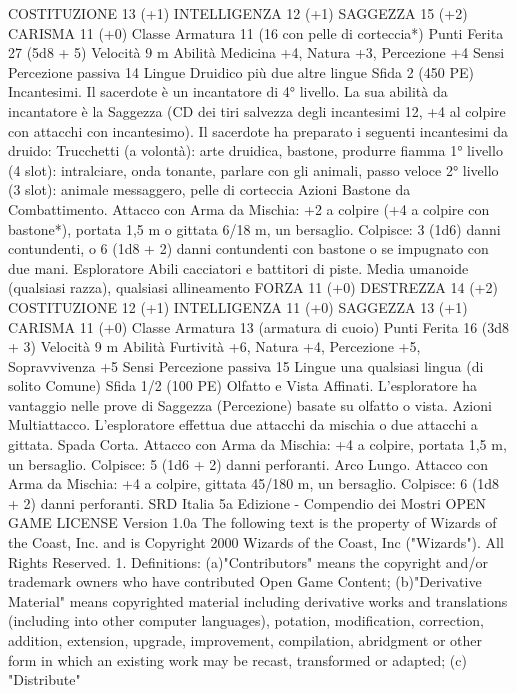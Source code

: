 \begin{multicols}{2}
COSTITUZIONE 13 (+1)
INTELLIGENZA 12 (+1)
SAGGEZZA 15 (+2)
CARISMA 11 (+0)
Classe Armatura 11 (16 con pelle di corteccia*)
Punti Ferita 27 (5d8 + 5)
Velocità 9 m
Abilità Medicina +4, Natura +3, Percezione +4
Sensi Percezione passiva 14
Lingue Druidico più due altre lingue
Sfida 2 (450 PE)
Incantesimi. Il sacerdote è un incantatore di 4° livello. La sua
abilità da incantatore è la Saggezza (CD dei tiri salvezza degli
incantesimi 12, +4 al colpire con attacchi con incantesimo). Il
sacerdote ha preparato i seguenti incantesimi da druido:
Trucchetti (a volontà): arte druidica, bastone, produrre fiamma
1° livello (4 slot): intralciare, onda tonante, parlare con gli
animali, passo veloce
2° livello (3 slot): animale messaggero, pelle di corteccia
Azioni
Bastone da Combattimento. Attacco con Arma da Mischia: +2 a
colpire (+4 a colpire con bastone*), portata 1,5 m o gittata 6/18
m, un bersaglio.
Colpisce: 3 (1d6) danni contundenti, o 6 (1d8 + 2) danni
contundenti con bastone o se impugnato con due mani.
Esploratore
Abili cacciatori e battitori di piste.
Media umanoide (qualsiasi razza), qualsiasi allineamento
FORZA 11 (+0)
DESTREZZA 14 (+2)
COSTITUZIONE 12 (+1)
INTELLIGENZA 11 (+0)
SAGGEZZA 13 (+1)
CARISMA 11 (+0)
Classe Armatura 13 (armatura di cuoio)
Punti Ferita 16 (3d8 + 3)
Velocità 9 m
Abilità Furtività +6, Natura +4, Percezione +5, Sopravvivenza
+5
Sensi Percezione passiva 15
Lingue una qualsiasi lingua (di solito Comune)
Sfida 1/2 (100 PE)
Olfatto e Vista Affinati. L’esploratore ha vantaggio nelle prove
di Saggezza (Percezione) basate su olfatto o vista.
Azioni
Multiattacco. L’esploratore effettua due attacchi da mischia o
due attacchi a gittata.
Spada Corta. Attacco con Arma da Mischia: +4 a colpire, portata
1,5 m, un bersaglio.
Colpisce: 5 (1d6 + 2) danni perforanti.
Arco Lungo. Attacco con Arma da Mischia: +4 a colpire, gittata
45/180 m, un bersaglio.
Colpisce: 6 (1d8 + 2) danni perforanti.
SRD Italia 5a Edizione - Compendio dei Mostri
OPEN GAME LICENSE Version 1.0a
The following text is the property of Wizards of
the Coast, Inc. and is Copyright 2000 Wizards of
the Coast, Inc ("Wizards"). All Rights Reserved.
1. Definitions: (a)"Contributors" means the
copyright and/or trademark owners who have
contributed Open Game Content; (b)"Derivative
Material" means copyrighted material including
derivative works and translations (including into
other computer languages), potation,
modification, correction, addition, extension,
upgrade, improvement, compilation, abridgment
or other form in which an existing work may be
recast, transformed or adapted; (c) "Distribute"

\end{multicols}
